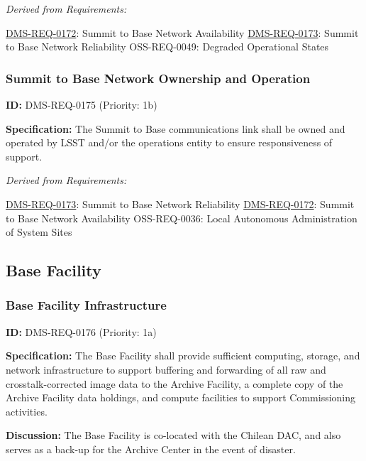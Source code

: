 \documentclass[SE,toc,lsstdraft]{lsstdoc}
\begin{document}
\emph{Derived from Requirements:}

\hyperref[DMS-REQ-0172]{DMS-REQ-0172}:
Summit to Base Network Availability \newline
\hyperref[DMS-REQ-0173]{DMS-REQ-0173}:
Summit to Base Network Reliability \newline
OSS-REQ-0049:
Degraded Operational States \newline

\subsubsection{Summit to Base Network Ownership and Operation}

\label{DMS-REQ-0175}
\textbf{ID:} DMS-REQ-0175 (Priority: 1b)

\textbf{Specification:} The Summit to Base communications link shall be owned and operated by LSST and/or the operations entity to ensure responsiveness of support.

\emph{Derived from Requirements:}

\hyperref[DMS-REQ-0173]{DMS-REQ-0173}:
Summit to Base Network Reliability \newline
\hyperref[DMS-REQ-0172]{DMS-REQ-0172}:
Summit to Base Network Availability \newline
OSS-REQ-0036:
Local Autonomous Administration of System Sites \newline

\subsection{Base Facility}

\subsubsection{Base Facility Infrastructure}

\label{DMS-REQ-0176}
\textbf{ID:} DMS-REQ-0176 (Priority: 1a)

\textbf{Specification:} The Base Facility shall provide sufficient computing, storage, and network infrastructure to support buffering and forwarding of all raw and crosstalk-corrected image data to the Archive Facility, a complete copy of the Archive Facility data holdings, and compute facilities to support Commissioning activities.

\textbf{Discussion:} The Base Facility is co-located with the Chilean DAC, and also serves as a back-up for the Archive Center in the event of disaster.
\end{document}
